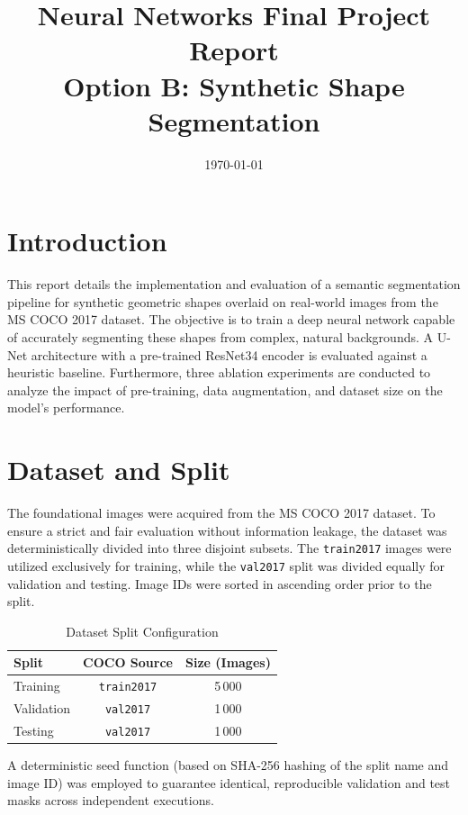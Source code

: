 \documentclass[11pt,a4paper]{article}
\title{Neural Networks Final Project Report \\ \large Option B: Synthetic Shape Segmentation}
\author{}
\date{\today}
\begin{document}
\maketitle

\section{Introduction}
This report details the implementation and evaluation of a semantic segmentation pipeline for synthetic geometric shapes overlaid on real-world images from the MS COCO 2017 dataset. The objective is to train a deep neural network capable of accurately segmenting these shapes from complex, natural backgrounds. A U-Net architecture with a pre-trained ResNet34 encoder is evaluated against a heuristic baseline. Furthermore, three ablation experiments are conducted to analyze the impact of pre-training, data augmentation, and dataset size on the model's performance.

\section{Dataset and Split}
The foundational images were acquired from the MS COCO 2017 dataset. To ensure a strict and fair evaluation without information leakage, the dataset was deterministically divided into three disjoint subsets. The \texttt{train2017} images were utilized exclusively for training, while the \texttt{val2017} split was divided equally for validation and testing. Image IDs were sorted in ascending order prior to the split.

\begin{table}[H]
    \centering
    \caption{Dataset Split Configuration}
    \begin{tabular}{lcc}
        \toprule
        \textbf{Split} & \textbf{COCO Source} & \textbf{Size (Images)} \\
        \midrule
        Training & \texttt{train2017} & 5\,000 \\
        Validation & \texttt{val2017} & 1\,000 \\
        Testing & \texttt{val2017} & 1\,000 \\
        \bottomrule
    \end{tabular}
    \label{tab:splits}
\end{table}

A deterministic seed function (based on SHA-256 hashing of the split name and image ID) was employed to guarantee identical, reproducible validation and test masks across independent executions.
\end{document}
